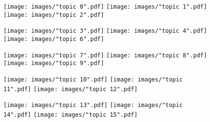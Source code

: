 \documentclass[a4paper]{article}
\begin{document}
	\begin{figure}[h]
		\texttt{[image: images/"topic 0".pdf]}
		\endminipage\hfill
		\texttt{[image: images/"topic 1".pdf]}
		\endminipage\hfill
		\texttt{[image: images/"topic 2".pdf]}
		\endminipage
	\end{figure}

	\begin{figure}[h]
		\texttt{[image: images/"topic 3".pdf]}
		\endminipage\hfill
		\texttt{[image: images/"topic 4".pdf]}
		\endminipage\hfill
		\texttt{[image: images/"topic 6".pdf]}
		\endminipage
	\end{figure}

	\begin{figure}[h]
		\texttt{[image: images/"topic 7".pdf]}
		\endminipage\hfill
		\texttt{[image: images/"topic 8".pdf]}
		\endminipage\hfill
		\texttt{[image: images/"topic 9".pdf]}
		\endminipage
	\end{figure}

	\begin{figure}[h]
		\texttt{[image: images/"topic 10".pdf]}
		\endminipage\hfill
		\texttt{[image: images/"topic 11".pdf]}
		\endminipage\hfill
		\texttt{[image: images/"topic 12".pdf]}
		\endminipage
	\end{figure}

	\begin{figure}[h]
		\texttt{[image: images/"topic 13".pdf]}
		\endminipage\hfill
		\texttt{[image: images/"topic 14".pdf]}
		\endminipage\hfill
		\texttt{[image: images/"topic 15".pdf]}
		\endminipage
	\end{figure}
\end{document}
